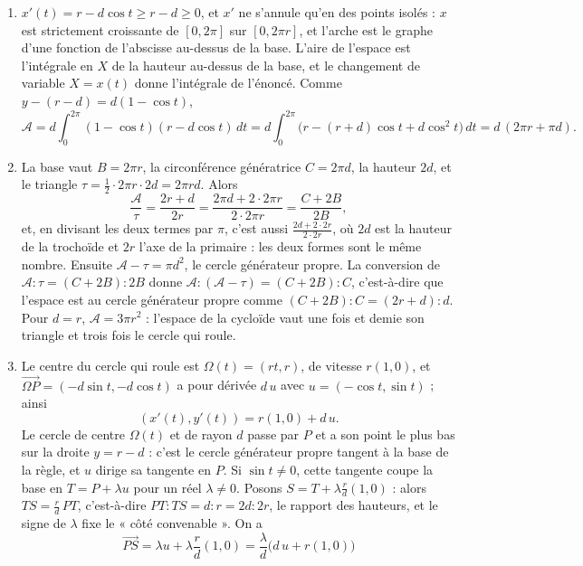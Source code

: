 \documentclass[11pt,a4paper]{article}
\begin{document}
\begin{solution}
\begin{enumerate}
\item $x'(t) = r - d\cos t \ge r - d \ge 0$, et $x'$ ne s'annule qu'en des points
  isolés : $x$ est strictement croissante de $[0, 2\pi]$ sur $[0, 2\pi r]$, et
  l'arche est le graphe d'une fonction de l'abscisse au-dessus de la base.
  L'aire de l'espace est l'intégrale en $X$ de la hauteur au-dessus de la base, et
  le changement de variable $X = x(t)$ donne l'intégrale de l'énoncé. Comme
  $y - (r - d) = d(1 - \cos t)$,
  \[
  \mathcal A = d\int_0^{2\pi}(1 - \cos t)(r - d\cos t)\,dt
  = d\int_0^{2\pi}\bigl(r - (r + d)\cos t + d\cos^2 t\bigr)\,dt
  = d\,(2\pi r + \pi d).
  \]
\item La base vaut $B = 2\pi r$, la circonférence génératrice $C = 2\pi d$, la
  hauteur $2d$, et le triangle $\tau = \frac12\cdot 2\pi r\cdot 2d = 2\pi r d$.
  Alors
  \[
  \frac{\mathcal A}{\tau} = \frac{2r + d}{2r} = \frac{2\pi d + 2\cdot 2\pi r}{2\cdot 2\pi r}
  = \frac{C + 2B}{2B},
  \]
  et, en divisant les deux termes par $\pi$, c'est aussi $\frac{2d + 2\cdot 2r}{2\cdot 2r}$,
  où $2d$ est la hauteur de la trochoïde et $2r$ l'axe de la primaire : les deux
  formes sont le même nombre. Ensuite $\mathcal A - \tau = \pi d^2$, le cercle
  générateur propre. La conversion de $\mathcal A : \tau = (C + 2B) : 2B$ donne
  $\mathcal A : (\mathcal A - \tau) = (C + 2B) : C$, c'est-à-dire que l'espace est
  au cercle générateur propre comme $(C + 2B) : C = (2r + d) : d$. Pour $d = r$,
  $\mathcal A = 3\pi r^2$ : l'espace de la cycloïde vaut une fois et demie son
  triangle et trois fois le cercle qui roule.
\item Le centre du cercle qui roule est $\Omega(t) = (rt, r)$, de vitesse $r(1, 0)$,
  et $\overrightarrow{\Omega P} = (-d\sin t, -d\cos t)$ a pour dérivée
  $d\,u$ avec $u = (-\cos t, \sin t)$ ; ainsi
  \[
  (x'(t), y'(t)) = r(1, 0) + d\,u .
  \]
  Le cercle de centre $\Omega(t)$ et de rayon $d$ passe par $P$ et a son point le
  plus bas sur la droite $y = r - d$ : c'est le cercle générateur propre tangent à
  la base de la règle, et $u$ dirige sa tangente en $P$. Si $\sin t \ne 0$, cette
  tangente coupe la base en $T = P + \lambda u$ pour un réel $\lambda \ne 0$.
  Posons $S = T + \lambda\frac{r}{d}(1, 0)$ : alors $TS = \frac rd\,PT$,
  c'est-à-dire $PT : TS = d : r = 2d : 2r$, le rapport des hauteurs, et le signe
  de $\lambda$ fixe le « côté convenable ». On a
  \[
  \overrightarrow{PS} = \lambda u + \lambda\frac rd(1, 0) = \frac{\lambda}{d}\bigl(d\,u + r(1, 0)\bigr)
\]
\end{enumerate}
\end{solution}
\end{document}
